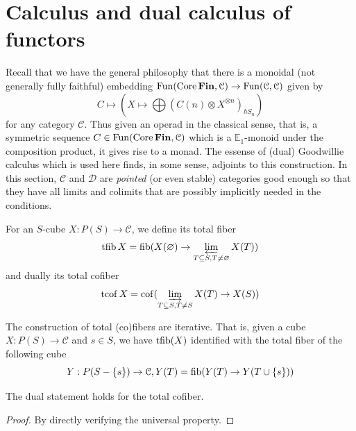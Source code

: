 \section{Calculus and dual calculus of functors}

	Recall that we have the general philosophy that there is a monoidal (not generally fully faithful) embedding $\operatorname{\mathrm{Fun}}(\operatorname{\mathrm{Core}}\mathbf{Fin},\mathcal{C})\to\operatorname{\mathrm{Fun}}(\mathcal{C},\mathcal{C})$ given by 
	\[ C\mapsto(X\mapsto\bigoplus(C(n)\otimes X^{\otimes n})_{hS_n}) \] 
	for any category $\mathcal{C}$. Thus given an operad in the classical sense, that is, a symmetric sequence $C\in\operatorname{\mathrm{Fun}}(\operatorname{\mathrm{Core}}\mathbf{Fin},\mathcal{C})$ which is a $\mathbb{E}_1$-monoid under the composition product, it gives rise to a monad. The essense of (dual) Goodwillie calculus which is used here finds, in some sense, adjoints to this construction. In this section, $\mathcal{C}$ and $\mathcal{D}$ are \emph{pointed} (or even stable) categories good enough so that they have all limits and colimits that are possibly implicitly needed in the conditions. 

	\begin{defn}\label{Tot_fib}
		For an $S$-cube $X:P(S)\to\mathcal{C}$, we define its total fiber 
		\[ \operatorname{\mathrm{tfib}} X=\operatorname{\mathrm{fib}}(X(\varnothing)\to\varprojlim_{T\subseteq S,T\neq\varnothing}X(T)) \]
		and dually its total cofiber 
		\[ \operatorname{\mathrm{tcof}} X=\operatorname{\mathrm{cof}}(\varinjlim_{T\subseteq S,T\neq S}X(T)\to X(S)) \]
	\end{defn}

	\begin{coro}\label{Tot_fib_iterative}
		The construction of total (co)fibers are iterative. That is, given a cube $X:P(S)\to\mathcal{C}$ and $s\in S$, we have $\operatorname{\mathrm{tfib}}(X)$ identified with the total fiber of the following cube 
		\[ Y:P(S-\{s\})\to\mathcal{C}, Y(T)=\operatorname{\mathrm{fib}}(Y(T)\to Y(T\cup\{s\})) \]

		The dual statement holds for the total cofiber. 
	\end{coro}
	\begin{proof}
		By directly verifying the universal property. 
	\end{proof}

